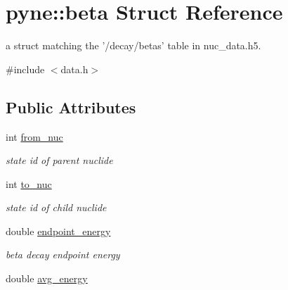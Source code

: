 \hypertarget{structpyne_1_1beta}{\section{pyne\+:\+:beta Struct Reference}
\label{structpyne_1_1beta}
}


a struct matching the '/decay/betas' table in nuc\+\_\+data.\+h5.  




{\ttfamily \#include $<$data.\+h$>$}

\subsection*{Public Attributes}
\begin{DoxyCompactItemize}
\item 
\hypertarget{structpyne_1_1beta_ad312f7cc9b8f0096aa1b797f28e10390}{int \hyperlink{structpyne_1_1beta_ad312f7cc9b8f0096aa1b797f28e10390}{from\+\_\+nuc}}\label{structpyne_1_1beta_ad312f7cc9b8f0096aa1b797f28e10390}

\begin{DoxyCompactList}\small\item\em state id of parent nuclide \end{DoxyCompactList}\item 
\hypertarget{structpyne_1_1beta_a359665983e92b3d729c6996faae54a18}{int \hyperlink{structpyne_1_1beta_a359665983e92b3d729c6996faae54a18}{to\+\_\+nuc}}\label{structpyne_1_1beta_a359665983e92b3d729c6996faae54a18}

\begin{DoxyCompactList}\small\item\em state id of child nuclide \end{DoxyCompactList}\item 
\hypertarget{structpyne_1_1beta_a1d23daf403d723e17a21070ebba1aa4f}{double \hyperlink{structpyne_1_1beta_a1d23daf403d723e17a21070ebba1aa4f}{endpoint\+\_\+energy}}\label{structpyne_1_1beta_a1d23daf403d723e17a21070ebba1aa4f}

\begin{DoxyCompactList}\small\item\em beta decay endpoint energy \end{DoxyCompactList}\item 
\hypertarget{structpyne_1_1beta_aef1da93efa75bfbb8c77604b8c24ba04}{double \hyperlink{structpyne_1_1beta_aef1da93efa75bfbb8c77604b8c24ba04}{avg\+\_\+energy}}\label{structpyne_1_1beta_aef1da93efa75bfbb8c77604b8c24ba04}


\end{DoxyCompactItemize}
